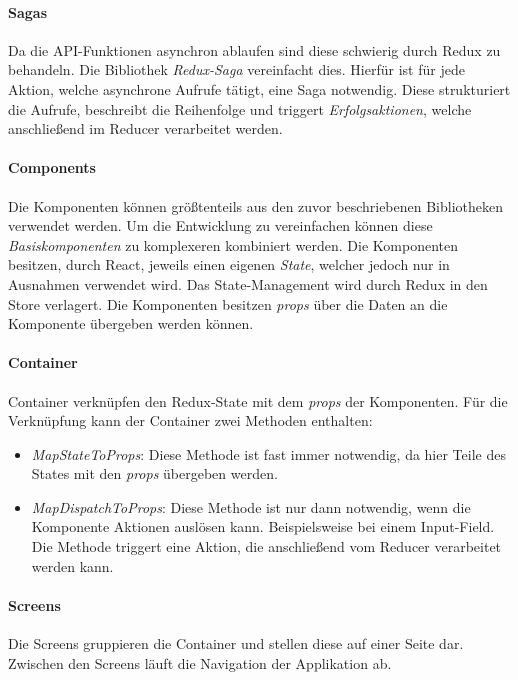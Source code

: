 \paragraph{Sagas}
Da die API-Funktionen asynchron ablaufen sind diese schwierig durch Redux zu behandeln.
Die Bibliothek \textit{Redux-Saga} vereinfacht dies.
Hierfür ist für jede Aktion, welche asynchrone Aufrufe tätigt, eine Saga notwendig. Diese strukturiert die Aufrufe, beschreibt
die Reihenfolge und triggert \textit{Erfolgsaktionen}, welche anschließend im Reducer
verarbeitet werden.

\paragraph{Components}
Die Komponenten können größtenteils aus den zuvor beschriebenen Bibliotheken verwendet werden.
Um die Entwicklung zu vereinfachen können diese \textit{Basiskomponenten} zu komplexeren kombiniert werden.
Die Komponenten besitzen, durch React,
jeweils einen eigenen \textit{State}, welcher jedoch nur in Ausnahmen verwendet wird.
Das State-Management wird durch Redux in den Store verlagert.
Die Komponenten besitzen \textit{props} über die
Daten an die Komponente übergeben werden können.

\paragraph{Container}
Container verknüpfen den Redux-State mit dem \textit{props} der Komponenten. Für die Verknüpfung
kann der Container zwei Methoden enthalten:
\begin{itemize}
    \item \textit{MapStateToProps}: Diese Methode ist fast immer notwendig, da hier Teile des States mit den \textit{props} übergeben werden.
    \item \textit{MapDispatchToProps}: Diese Methode ist nur dann notwendig, wenn die Komponente Aktionen auslösen kann. Beispielsweise bei einem Input-Field.
    Die Methode triggert eine Aktion, die anschließend vom Reducer verarbeitet werden kann.
\end{itemize}

\paragraph{Screens}
Die Screens gruppieren die Container und stellen diese auf einer Seite dar.
Zwischen den Screens läuft die Navigation der Applikation ab.

